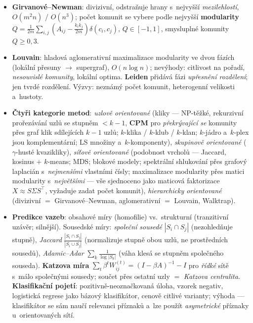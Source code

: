 \documentclass[11pt,a4paper]{article}
\theoremstyle{definition}
\begin{document}
\begin{itemize}
      a~balančními omezeními \textbf{NP-těžké} $\Rightarrow$ \emph{poměrový} a~\emph{normalizovaný
      řez} (dělení $|C_i|$, resp.\ $\mathrm{vol}(C_i)$).
\item \textbf{Girvanové--Newman}: divizivní, odstraňuje hrany s~nejvyšší \emph{mezilehlostí},
      $O(m^2n)$ / $O(n^3)$; počet komunit se vybere podle nejvyšší \textbf{modularity}
      $Q=\frac{1}{2m}\sum_{i,j}(A_{ij}-\frac{k_ik_j}{2m})\delta(c_i,c_j)$, $Q\in[-1,1]$,
      smysluplné komunity $Q\ge 0{,}3$.
\item \textbf{Louvain}: hladová aglomerativní maximalizace modularity ve dvou fázích (lokální
      přesuny $\to$ supergraf), $O(n\log n)$; nevýhody: citlivost na pořadí, \emph{nesouvislé
      komunity}, lokální optima. \textbf{Leiden} přidává fázi \emph{upřesnění rozdělení}; jen
      tvrdé rozdělení. Výzvy: neznámý počet komunit, heterogenní velikosti a~hustoty.
\item \textbf{Čtyři kategorie metod}: \emph{uzlově orientované} (kliky --- NP-těžké, rekurzivní
      prořezávání uzlů se stupněm $<k-1$, \textbf{CPM} pro \emph{překrývající se} komunity
      přes graf klik sdílejících $k-1$ uzlů; $k$-klika / $k$-klub / $k$-klan; $k$-jádro
      a~$k$-plex jsou komplementární; LS množiny a~$k$-komponenty), \emph{skupinově
      orientované} ($\gamma$-husté kvazikliky), \emph{síťově orientované} (podobnost vrcholů ---
      Jaccard, kosinus $+$ $k$-means; MDS; blokové modely; spektrální shlukování přes grafový
      laplacián s~\emph{nejmenšími} vlastními čísly; maximalizace modularity přes matici
      modularity s~\emph{největšími} --- vše sjednoceno jako maticová faktorizace
      $X\approx S\Sigma S^{\!\top}$, vyžaduje zadat počet komunit), \emph{hierarchicky
      orientované} (divizivní $=$ Girvanové--Newman, aglomerativní $=$ Louvain, Walktrap).
\item \textbf{Predikce vazeb}: obsahové míry (homofilie) vs.\ strukturní (tranzitivní uzávěr;
      silnější). Sousedské míry: \emph{společní sousedé} $|S_i\cap S_j|$ (nezohledňuje stupně),
      \emph{Jaccard} $\frac{|S_i\cap S_j|}{|S_i\cup S_j|}$ (normalizuje stupně obou uzlů, ne
      prostředních sousedů), \emph{Adamic--Adar} $\sum_{k}\frac{1}{\log|S_k|}$ (váha klesá se
      stupněm společného souseda). \textbf{Katzova míra}
      $\sum_t\beta^tW_{ij}^{(t)}=(I-\beta A)^{-1}-I$ pro \emph{řídké} sítě s~málo společnými
      sousedy; součet přes ostatní uzly $=$ \emph{Katzova centralita}. \textbf{Klasifikační
      pojetí}: pozitivně-neoznačkovaná úloha, vzorek negativ, logistická regrese jako bázový
      klasifikátor, cenově citlivé varianty; výhoda --- klasifikátor se sám naučí relevanci
      příznaků a~lze použít \emph{asymetrické} příznaky u~orientovaných sítí.
\end{itemize}
\end{document}
